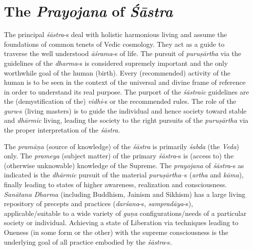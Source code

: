 \newpage

\section*{The \textit{Prayojana} of \textit{Śāstra}}

The principal \textit{śāstra}-s deal with holistic harmonious living and assume the foundations of common tenets of Vedic cosmology. They act as a guide to traverse the well understood \textit{āśrama}-s of life. The pursuit of \textit{puruṣārtha} via the guidelines of the \textit{dharma}-s is considered supremely important and the only worthwhile goal of the human (birth). Every (recommended) activity of the human is to be seen in the context of the universal and divine frame of reference in order to understand its real purpose. The purport of the \textit{śāstraic} guidelines are the (demystification of the) \textit{vidhi}-s or the recommended rules. The role of the \textit{guru}-s (living masters) is to guide the individual and hence society toward stable and \textit{dhārmic} living, leading the society to the right pursuits of the \textit{puruṣārtha} via the proper interpretation of the \textit{śāstra}.

The \textit{pramāṇa} (source of knowledge) of the \textit{śāstra} is primarily \textit{śabda} (the \textit{Veda}) only. The \textit{prameya} (subject matter) of the primary \hbox{\textit{śāstra}-s} is (access to) the (otherwise unknowable) knowledge of the Supreme. The \textit{prayojana} of \textit{śāstra}-s as indicated is the \textit{dhārmic} pursuit of the material \textit{puruṣārtha}–s (\textit{artha} and \textit{kāma}), finally leading to states of higher awareness, realization and consciousness. \textit{Sanātana Dharma} (including Buddhism, Jainism and Sikhism) has a large living repository of precepts and practices (\textit{darśana}-s, \textit{sampradāya}-s), applicable/suitable to a wide variety of \textit{guṇa} configurations/needs of a particular society or individual. Achieving a state of Liberation via techniques leading to Oneness (in some form or the other) with the supreme consciousness is the underlying goal of all practice embodied by the \textit{śāstra}-s.

